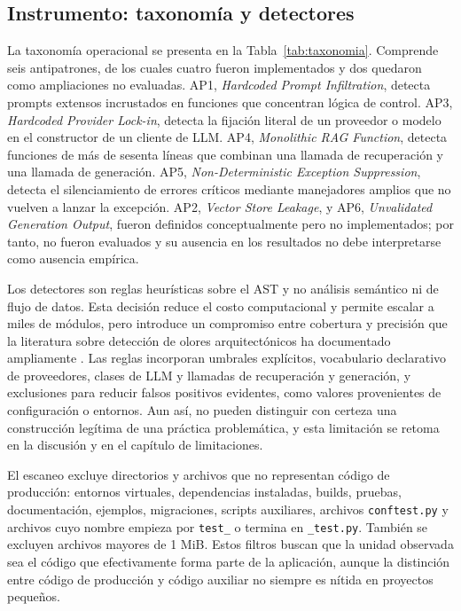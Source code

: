 \subsection{Instrumento: taxonomía y detectores}

La taxonomía operacional se presenta en la Tabla~\ref{tab:taxonomia}. Comprende seis antipatrones, de los cuales cuatro fueron implementados y dos quedaron como ampliaciones no evaluadas. AP1, \emph{Hardcoded Prompt Infiltration}, detecta prompts extensos incrustados en funciones que concentran lógica de control. AP3, \emph{Hardcoded Provider Lock-in}, detecta la fijación literal de un proveedor o modelo en el constructor de un cliente de LLM. AP4, \emph{Monolithic RAG Function}, detecta funciones de más de sesenta líneas que combinan una llamada de recuperación y una llamada de generación. AP5, \emph{Non-Deterministic Exception Suppression}, detecta el silenciamiento de errores críticos mediante manejadores amplios que no vuelven a lanzar la excepción. AP2, \emph{Vector Store Leakage}, y AP6, \emph{Unvalidated Generation Output}, fueron definidos conceptualmente pero no implementados; por tanto, no fueron evaluados y su ausencia en los resultados no debe interpretarse como ausencia empírica.



Los detectores son reglas heurísticas sobre el AST y no análisis semántico ni de flujo de datos. Esta decisión reduce el costo computacional y permite escalar a miles de módulos, pero introduce un compromiso entre cobertura y precisión que la literatura sobre detección de olores arquitectónicos ha documentado ampliamente \cite{martini_identifying_2018,fontana_arcan_2017,mumtaz_systematic_2021}. Las reglas incorporan umbrales explícitos, vocabulario declarativo de proveedores, clases de LLM y llamadas de recuperación y generación, y exclusiones para reducir falsos positivos evidentes, como valores provenientes de configuración o entornos. Aun así, no pueden distinguir con certeza una construcción legítima de una práctica problemática, y esta limitación se retoma en la discusión y en el capítulo de limitaciones.

El escaneo excluye directorios y archivos que no representan código de producción: entornos virtuales, dependencias instaladas, builds, pruebas, documentación, ejemplos, migraciones, scripts auxiliares, archivos \texttt{conftest.py} y archivos cuyo nombre empieza por \texttt{test\_} o termina en \texttt{\_test.py}. También se excluyen archivos mayores de 1 MiB. Estos filtros buscan que la unidad observada sea el código que efectivamente forma parte de la aplicación, aunque la distinción entre código de producción y código auxiliar no siempre es nítida en proyectos pequeños.

